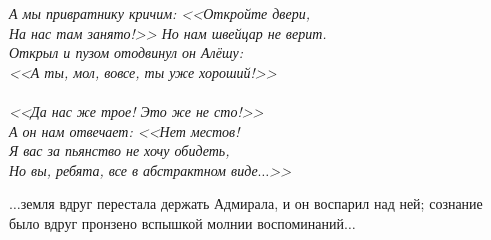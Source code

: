 \vspace{0.2cm}
\noindent\textit{%
	\hspace*{1.5cm}А мы привратнику кричим: <<Откройте двери, \\
	\hspace*{1.5cm}На нас там занято!>> Но нам швейцар не верит. \\
	\hspace*{1.5cm}Открыл и пузом отодвинул он Алёшу: \\
	\hspace*{1.5cm}<<А ты, мол, вовсе, ты уже хороший!>>\\
	\\
	\hspace*{1.5cm}<<Да нас же трое! Это же не сто!>>\\
	\hspace*{1.5cm}А он нам отвечает: <<Нет местов!\\
	\hspace*{1.5cm}Я вас за пьянство не хочу обидеть,\\
	\hspace*{1.5cm}Но вы, ребята, все в абстрактном виде$\ldots$>> 
}
\vspace{0.2cm}

$\ldots$земля вдруг перестала держать Адмирала, и он воспарил над ней; сознание было вдруг пронзено вспышкой молнии воспоминаний$\ldots$



